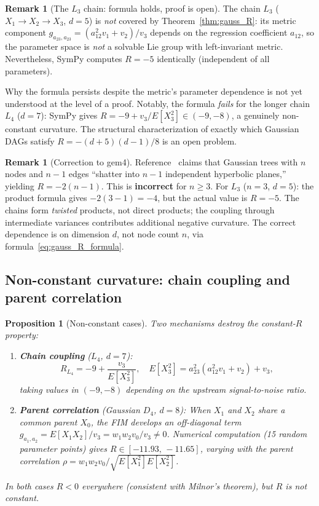 \documentclass[11pt]{article}
\newtheorem{proposition}[theorem]{Proposition}
\theoremstyle{definition}
\newtheorem{remark}[theorem]{Remark}
\begin{document}
\begin{remark}[The $L_3$ chain: formula holds, proof is open]\label{rem:L3_open}
The chain $L_3$ ($X_1\to X_2\to X_3$, $d=5$) is \emph{not} covered by 
Theorem~\ref{thm:gauss_R}: its metric component 
$g_{a_{23},a_{23}} = (a_{12}^2 v_1 + v_2)/v_3$ depends on the 
regression coefficient $a_{12}$, so the parameter space is \emph{not} 
a solvable Lie group with left-invariant metric.  Nevertheless, 
SymPy computes $R = -5$ identically (independent of all parameters).  

Why the formula persists despite the metric's parameter dependence 
is not yet understood at the level of a proof.  Notably, the formula 
\emph{fails} for the longer chain $L_4$ ($d=7$): SymPy gives 
$R = -9 + v_3/E[X_3^2] \in (-9,-8)$, a genuinely non-constant curvature.  
The structural characterization of exactly which Gaussian DAGs satisfy 
$R = -(d+5)(d-1)/8$ is an open problem.
\end{remark}

\begin{remark}[Correction to gem4]
Reference~\cite{gem4} claims that Gaussian trees with $n$ nodes and $n-1$ 
edges ``shatter into $n-1$ independent hyperbolic planes,'' yielding 
$R = -2(n-1)$.  This is \textbf{incorrect} for $n \geq 3$.  
For $L_3$ ($n=3$, $d=5$): the product formula gives $-2(3-1)=-4$, 
but the actual value is $R=-5$.  The chains form \emph{twisted} products, 
not direct products; the coupling through intermediate variances 
contributes additional negative curvature.  
The correct dependence is on dimension $d$, not node count $n$, 
via formula~\eqref{eq:gauss_R_formula}.
\end{remark}

\subsection{Non-constant curvature: chain coupling and parent correlation}

\begin{proposition}[Non-constant cases]\label{prop:nonconstant}
Two mechanisms destroy the constant-$R$ property:
\begin{enumerate}
\item \textbf{Chain coupling} ($L_4$, $d=7$): 
\[
  R_{L_4} = -9 + \frac{v_3}{E[X_3^2]}, \quad 
  E[X_3^2] = a_{23}^2(a_{12}^2 v_1 + v_2) + v_3,
\]
taking values in $(-9,-8)$ depending on the upstream signal-to-noise ratio.

\item \textbf{Parent correlation} (Gaussian $D_4$, $d=8$): 
When $X_1$ and $X_2$ share a common parent $X_0$, the FIM develops 
an off-diagonal term $g_{a_1,a_2} = E[X_1 X_2]/v_3 = w_1 w_2 v_0/v_3 \neq 0$.  
Numerical computation (15 random parameter points) gives 
$R \in [-11.93,\,-11.65]$, varying with the parent correlation 
$\rho = w_1 w_2 v_0/\sqrt{E[X_1^2]E[X_2^2]}$.
\end{enumerate}
In both cases $R < 0$ everywhere (consistent with Milnor's theorem), 
but $R$ is not constant.
\end{proposition}
\end{document}
